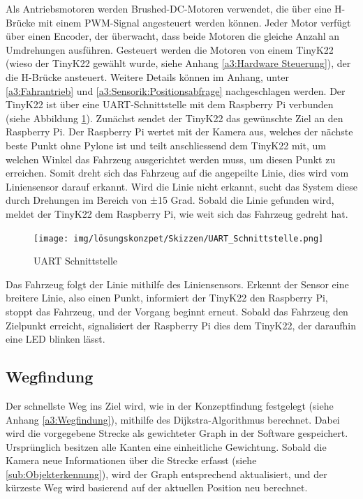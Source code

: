 \documentclass[../main.tex]{subfiles}
\begin{document}
Als Antriebsmotoren werden Brushed-DC-Motoren verwendet, die über eine H-Brücke mit einem PWM-Signal angesteuert werden können. Jeder Motor verfügt über einen Encoder, der überwacht, dass beide Motoren die gleiche Anzahl an Umdrehungen ausführen. Gesteuert werden die Motoren von einem TinyK22 (wieso der TinyK22 gewählt wurde, siehe Anhang \ref{a3:Hardware Steuerung}), der die H-Brücke ansteuert. Weitere Details können im Anhang, unter \ref{a3:Fahrantrieb} und \ref{a3:Sensorik:Positionsabfrage} nachgeschlagen werden.
\newpage
Der TinyK22 ist über eine UART-Schnittstelle mit dem Raspberry Pi verbunden (siehe Abbildung \ref{img:UART_Schnittstelle}). Zunächst sendet der TinyK22 das gewünschte Ziel an den Raspberry Pi. Der Raspberry Pi wertet mit der Kamera aus, welches der nächste beste Punkt ohne Pylone ist und teilt anschliessend dem TinyK22 mit, um welchen Winkel das Fahrzeug ausgerichtet werden muss, um diesen Punkt zu erreichen. Somit dreht sich das Fahrzeug auf die angepeilte Linie, dies wird vom Liniensensor darauf erkannt. Wird die Linie nicht erkannt, sucht das System diese durch Drehungen im Bereich von ±15 Grad. Sobald die Linie gefunden wird, meldet der TinyK22 dem Raspberry Pi, wie weit sich das Fahrzeug gedreht hat.

\begin{figure}[H]
\centering
\texttt{[image: img/lösungskonzpet/Skizzen/UART\_Schnittstelle.png]}
\caption{UART Schnittstelle}
\label{img:UART_Schnittstelle}
\end{figure}

Das Fahrzeug folgt der Linie mithilfe des Liniensensors. Erkennt der Sensor eine breitere Linie, also einen Punkt, informiert der TinyK22 den Raspberry Pi, stoppt das Fahrzeug, und der Vorgang beginnt erneut. Sobald das Fahrzeug den Zielpunkt erreicht, signalisiert der Raspberry Pi dies dem TinyK22, der daraufhin eine LED blinken lässt.

\newpage

\subsection{Wegfindung}

Der schnellste Weg ins Ziel wird, wie in der Konzeptfindung festgelegt (siehe Anhang \ref{a3:Wegfindung}), mithilfe des Dijkstra-Algorithmus berechnet. Dabei wird die vorgegebene Strecke als gewichteter Graph in der Software gespeichert. Ursprünglich besitzen alle Kanten eine einheitliche Gewichtung. Sobald die Kamera neue Informationen über die Strecke erfasst (siehe \ref{sub:Objekterkennung}), wird der Graph entsprechend aktualisiert, und der kürzeste Weg wird basierend auf der aktuellen Position neu berechnet.
\end{document}
